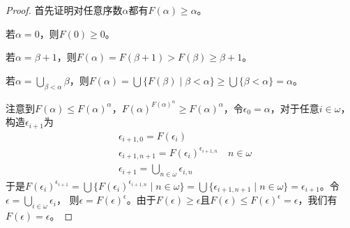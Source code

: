 \documentclass[11pt]{article}
\begin{document}
\begin{proof}
首先证明对任意序数\(\alpha\)都有\(F(\alpha)\ge\alpha\)。

若\(\alpha=0\)，则\(F(0)\ge 0\)。

若\(\alpha=\beta+1\)，则\(F(\alpha)=F(\beta+1)>F(\beta)\ge\beta+1\)。

若\(\alpha=\bigcup_{\beta<\alpha}\beta\)，则\(F(\alpha)=\bigcup\{F(\beta)\mid\beta<\alpha\}\ge\bigcup\{\beta<\alpha\}=\alpha\)。


注意到\(F(\alpha)\le F(\alpha)^\alpha\)，\(F(\alpha)^{F(\alpha)^\alpha}\ge F(\alpha)^\alpha\)，令\(\epsilon_0=\alpha\)，对于任意\(i\in\omega\)，构造\(\epsilon_{i+1}\)为
\begin{align*}
&\epsilon_{i+1,0}=F(\epsilon_i)\\
&\epsilon_{i+1,n+1}=F(\epsilon_i)^{\epsilon_{i+1,n}}\quad n\in\omega\\
&\epsilon_{i+1}=\bigcup_{n\in\omega}\epsilon_{i,n}
\end{align*}
于是\(F(\epsilon_i)^{\epsilon_{i+1}}=\bigcup\{F(\epsilon_i)^{\epsilon_{i+1,n}}\mid n\in\omega\}=\bigcup\{\epsilon_{i+1,n+1}\mid n\in\omega\}=\epsilon_{i+1}\)。令\(\epsilon=\bigcup_{i\in\omega}\epsilon_i\)，
则\(\epsilon=F(\epsilon)^\epsilon\)。由于\(F(\epsilon)\ge\epsilon\)且\(F(\epsilon)\le F(\epsilon)^\epsilon=\epsilon\)，我们有\(F(\epsilon)=\epsilon\)。
\end{proof}
\end{document}
